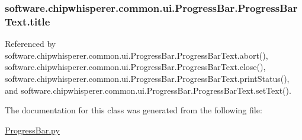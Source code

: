 \hypertarget{classsoftware_1_1chipwhisperer_1_1common_1_1ui_1_1ProgressBar_1_1ProgressBarText_a101723805be552dccb06d4cd259d6846}{}
\subsubsection[{title}]{\setlength{\rightskip}{0pt plus 5cm}software.\+chipwhisperer.\+common.\+ui.\+Progress\+Bar.\+Progress\+Bar\+Text.\+title}\label{classsoftware_1_1chipwhisperer_1_1common_1_1ui_1_1ProgressBar_1_1ProgressBarText_a101723805be552dccb06d4cd259d6846}


Referenced by software.\+chipwhisperer.\+common.\+ui.\+Progress\+Bar.\+Progress\+Bar\+Text.\+abort(), software.\+chipwhisperer.\+common.\+ui.\+Progress\+Bar.\+Progress\+Bar\+Text.\+close(), software.\+chipwhisperer.\+common.\+ui.\+Progress\+Bar.\+Progress\+Bar\+Text.\+print\+Status(), and software.\+chipwhisperer.\+common.\+ui.\+Progress\+Bar.\+Progress\+Bar\+Text.\+set\+Text().



The documentation for this class was generated from the following file\+:\begin{DoxyCompactItemize}
\item 
\hyperlink{ProgressBar_8py}{Progress\+Bar.\+py}\end{DoxyCompactItemize}
